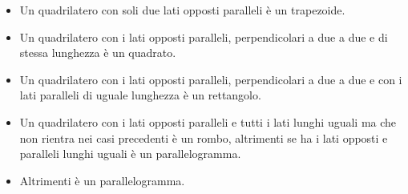 \documentclass[]{scrartcl}
\begin{document}
\begin{enumerate}
\begin{itemize}
	\item Un quadrilatero con soli due lati opposti paralleli è un trapezoide.
	\item Un quadrilatero con i lati opposti paralleli, perpendicolari a due a due e di stessa lunghezza è un quadrato.
	\item Un quadrilatero con i lati opposti paralleli, perpendicolari a due a due e con i lati paralleli di uguale lunghezza è un rettangolo.
	\item Un quadrilatero con i lati opposti paralleli e tutti i lati lunghi uguali ma che non rientra nei casi precedenti è un rombo, altrimenti se ha i lati opposti e paralleli lunghi uguali è un parallelogramma.
	\item Altrimenti è un parallelogramma.
\end{itemize}


\end{enumerate}
\end{document}
